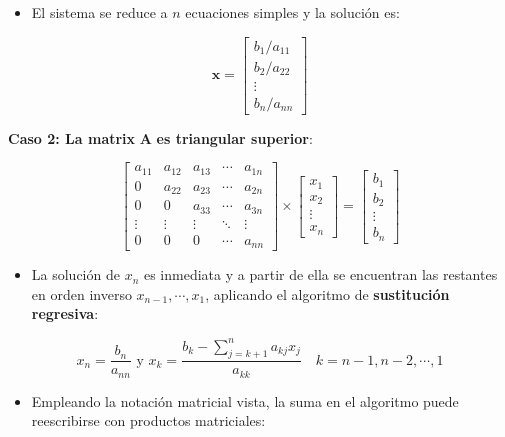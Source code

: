 \documentclass[openany]{book}
\providecommand{\tightlist}{%
  \setlength{\itemsep}{0pt}\setlength{\parskip}{0pt}}
\begin{document}
\begin{itemize}
\tightlist
\item
  El sistema se reduce a \(n\) ecuaciones simples y la solución es:
\end{itemize}

\[
\mathbf{x} =
\begin{bmatrix}
    b_1/a_{11} \\ b_2/a_{22} \\ \vdots \\ b_n/a_{nn}
\end{bmatrix}
\]

\textbf{Caso 2: La matrix} \(\mathbf{A}\) \textbf{es triangular superior}:

\[
\begin{bmatrix}
a_{11} & a_{12} & a_{13} & \cdots & a_{1n} \\
0 & a_{22} & a_{23} & \cdots & a_{2n} \\
0 & 0 & a_{33} & \cdots & a_{3n} \\
\vdots & \vdots & \vdots & \ddots & \vdots \\
0 & 0 & 0 & \cdots & a_{nn}
\end{bmatrix}
\times 
\begin{bmatrix}
x_1 \\ x_2 \\ \vdots \\ x_n
\end{bmatrix}
=
\begin{bmatrix}
b_1 \\ b_2 \\ \vdots \\ b_n
\end{bmatrix}
\]

\begin{itemize}
\tightlist
\item
  La solución de \(x_n\) es inmediata y a partir de ella se encuentran las restantes en orden inverso \(x_{n-1}, \cdots, x_1\), aplicando el algoritmo de \textbf{sustitución regresiva}:
\end{itemize}

\[
x_n = \frac{b_n}{a_{nn}} \text{ y } x_k = \frac{b_k - \sum_{j = k+1}^{n}a_{kj}x_j}{a_{kk}} \quad k = n-1, n-2, \cdots, 1
\]

\begin{itemize}
\tightlist
\item
  Empleando la notación matricial vista, la suma en el algoritmo puede reescribirse con productos matriciales:
\end{itemize}
\end{document}
